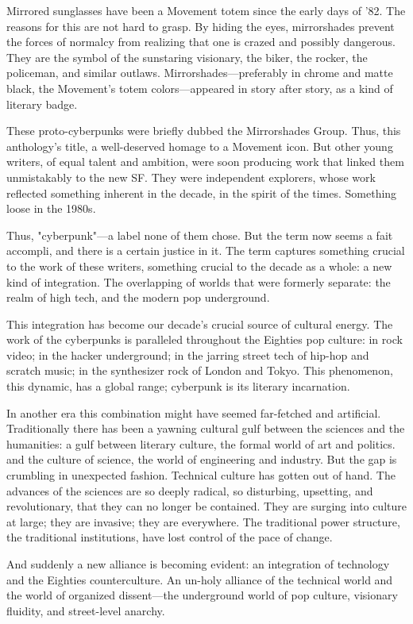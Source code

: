Mirrored sunglasses have been a Movement totem since the early days of '82. The reasons for this are not hard to grasp. By hiding the eyes, mirrorshades prevent the forces of normalcy from realizing that one is crazed and possibly dangerous. They are the symbol of the sunstaring visionary, the biker, the rocker, the policeman, and similar outlaws. Mirrorshades—preferably in chrome and matte black, the Movement's totem colors—appeared in story after story, as a kind of literary badge.

These proto-cyberpunks were briefly dubbed the Mirrorshades Group. Thus, this anthology's title, a well-deserved homage to a Movement icon. But other young writers, of equal talent and ambition, were soon producing work that linked them unmistakably to the new SF. They were independent explorers, whose work reflected something inherent in the decade, in the spirit of the times. Something loose in the 1980s.

Thus, "cyberpunk"—a label none of them chose. But the term now seems a fait accompli, and there is a certain justice in it. The term captures something crucial to the work of these writers, something crucial to the decade as a whole: a new kind of integration. The overlapping of worlds that were formerly separate: the realm of high tech, and the modern pop underground.

This integration has become our decade's crucial source of cultural energy. The work of the cyberpunks is paralleled throughout the Eighties pop culture: in rock video; in the hacker underground; in the jarring street tech of hip-hop and scratch music; in the synthesizer rock of London and Tokyo. This phenomenon, this dynamic, has a global range; cyberpunk is its literary incarnation.

In another era this combination might have seemed far-fetched and artificial. Traditionally there has been a yawning cultural gulf between the sciences and the humanities: a gulf between literary culture, the formal world of art and politics. and the culture of science, the world of engineering and industry.
But the gap is crumbling in unexpected fashion. Technical culture has gotten out of hand. The advances of the sciences are so deeply radical, so disturbing, upsetting, and revolutionary, that they can no longer be contained. They are surging into culture at large; they are invasive; they are everywhere. The traditional power structure, the traditional institutions, have lost control of the pace of change.

And suddenly a new alliance is becoming evident: an integration of technology and the Eighties counterculture. An un-holy alliance of the technical world and the world of organized dissent—the underground world of pop culture, visionary fluidity, and street-level anarchy.

